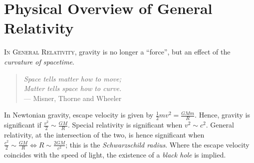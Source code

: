 { %
\renewcommand{\thechapter}{\arabic{chapter}} %
\chapter{Physical Overview of General Relativity}
}

\textsc{In General Relativity}, gravity is no longer a ``force'', but an effect of the \emph{curvature of spacetime}.

\begin{quote}
	\emph{Space tells matter how to move; \\
	\hspace*{1em} Matter tells space how to curve.} \\
	\hspace*{2em} --- Misner, Thorne and Wheeler
\end{quote}

\begin{center}
\end{center}

\noindent
In Newtonian gravity, escape velocity is given by $\frac12mv^2 = \frac{GMm}{R}$.
Hence, gravity is significant if $\frac{v^2}{2} \sim \frac{GM}{R}$.
Special relativity is significant when $v^2 \sim c^2$.
General relativity, at the intersection of the two, is hence significant when $\frac{c^2}{2} \sim \frac{GM}{R} \iff R \sim \frac{2GM}{c^2}$; this is the \emph{Schwarzschild radius}.
Where the escape velocity coincides with the speed of light, the existence of a \emph{black hole} is implied.